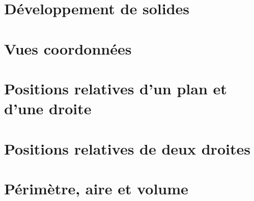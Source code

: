 \documentclass[../../syllabus_1.tex]{subfiles}
\begin{document}
\section{Développement de solides}
\section{Vues coordonnées}

\section{Positions relatives d'un plan et d'une droite}
\section{Positions relatives de deux droites}
\section{Périmètre, aire et volume}
\end{document}
